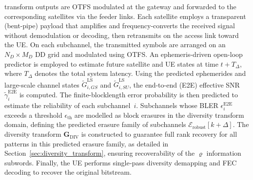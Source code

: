 \documentclass[lettersize,journal]{IEEEtran}
\begin{document}
transform outputs are OTFS modulated at the gateway and forwarded to the corresponding satellites via the feeder links. Each satellite employs a 
transparent (bent-pipe) payload that amplifies and frequency-converts the 
received signal without demodulation or decoding, then retransmits on the access 
link toward the UE. On each subchannel, the transmitted symbols are arranged on an $N_D \times M_D$ DD grid and modulated using OTFS. An ephemeris-driven open-loop predictor is employed to estimate future 
satellite and UE states at time $t + T_{\Delta}$, where $T_{\Delta}$ 
denotes the total system latency. Using the predicted ephemerides and 
large-scale channel states $\tilde{G}_{i,GS}^{\mathrm{LS}}$ and 
$\tilde{G}_{i,SU}^{\mathrm{LS}}$, the end-to-end (E2E) effective SNR 
$\tilde{\gamma}_{i}^{\mathrm{E2E}}$ is computed. The finite-blocklength 
error probability is then predicted to estimate the reliability of each 
subchannel~$i$. Subchannels whose BLER $\epsilon_{i}^{\mathrm{E2E}}$ exceeds a threshold $\epsilon_{\mathrm{th}}$ are modelled as block erasures in the diversity transform domain, defining the predicted erasure family of subchannels $\mathcal{E}_{\mathrm{robust}}[k+\Delta]$. The 
diversity transform $\mathbf{G}_{\mathrm{DIV}}$ is constructed to 
guarantee full rank recovery for all patterns in this predicted erasure family, as detailed in Section~\ref{sec:diversity_transform}, ensuring 
recoverability of the $\varrho$ information subwords. Finally, the UE performs single‑pass diversity demapping and FEC decoding to recover the original bitstream.
\end{document}
